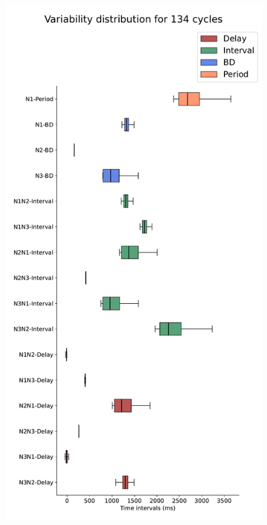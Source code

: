 \begin{figure}[hbt!]
\begin{minipage}[b]{0.45\textwidth}
		\includegraphics[width=\textwidth]{invariants/data/MODEL/n1m_driven/images/3phases/_boxplot.pdf}
	\end{minipage}
	\begin{minipage}[b]{0.53\textwidth}
		\centering
		\begin{minipage}[b]{\textwidth}

\end{minipage}
\end{minipage}
\end{figure}
